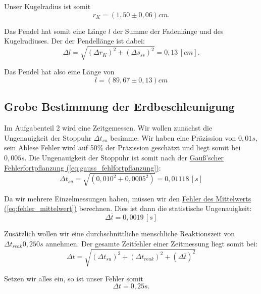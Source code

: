 Unser Kugelradius ist somit 
\begin{equation}
    \boxed{
        r_K = (1,50 \pm 0,06)cm.
    }
\end{equation}

Das Pendel hat somit eine Länge $l$ der Summe der Fadenlänge und des Kugelradiuses. Der der Pendellänge ist dabei:
\begin{equation}
    \Delta l = \sqrt{(\Delta r_K)^2 + (\Delta s_{ss})^2} = 0,13 \, [cm].
\end{equation} 

Das Pendel hat also eine Länge von
\begin{equation}
\boxed{
    l = (89,67 \pm 0,13)cm
}
\end{equation}


\subsection*{Grobe Bestimmung der Erdbeschleunigung}
Im Aufgabenteil 2 wird eine Zeitgemessen. Wir wollen zunächst die Ungenauigkeit der Stoppuhr $\Delta t_{su}$ besimme. Wir haben eine Präzission von $0,01s$, sein Ablese Fehler wird auf 50\% der Präzission geschätzt und liegt somit bei $0,005s$. Die Ungenauigkeit der Stoppuhr ist somit nach der \hyperref[eq:gauss_fehlfortpflanzung]{Gauß'scher Fehlerfortpflanzung (\ref*{eq:gauss_fehlfortpflanzung})}:
\begin{equation}
    \Delta t_{su} = \sqrt{(0,010^2 + 0,0005^2)} = 0,01118 \, [s]
\end{equation}

Da wir mehrere Einzelmessungen haben, müssen wir den \hyperref[eq:fehler_mittelwert]{Fehler des Mittelwerts (\ref*{eq:fehler_mittelwert})} berechnen. Dies ist dann die statistische Ungenauigkeit:
\begin{equation}
    \Delta \overline{t} = 0,0019 \, [s]
\end{equation}

Zusätzlich wollen wir eine durchschnittliche menschliche Reaktionszeit von $\Delta t_{reak} 0,250s$ annehmen. Der gesamte Zeitfehler einer Zeitmessung liegt somit bei:
\begin{equation}
    \Delta t = \sqrt{(\Delta t_{su})^2+ (\Delta t_{reak})^2 + (\Delta \overline{t})^2}
    \label{eq:f_zeit}
\end{equation}

Setzen wir alles ein, so ist unser Fehler somit
\begin{equation}
    \Delta t = 0,25 s.
\end{equation}


